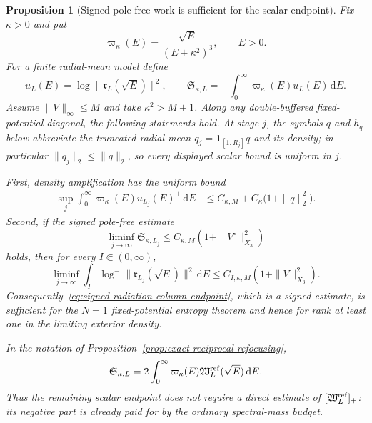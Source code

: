 \documentclass[11pt]{article}
\newcommand{\dd}{\,\mathrm d}
\newtheorem{proposition}[theorem]{Proposition}
\theoremstyle{definition}
\theoremstyle{remark}
\begin{document}
\begin{proposition}[Signed pole-free work is sufficient for the scalar endpoint]
\label{prop:signed-radiation-column-reduction}
Fix $\kappa>0$ and put
\begin{equation}
 \varpi_\kappa(E)=\frac{\sqrt E}{(E+\kappa^2)^3},
 \qquad E>0.
 \label{eq:rational-second-trace-weight}
\end{equation}
For a finite radial-mean model define
\begin{equation}
 u_L(E)=\log\|\mathfrak r_L(\sqrt E)\|^2,
 \qquad
 \mathfrak S_{\kappa,L}
 =-\int_0^\infty\varpi_\kappa(E)u_L(E)\dd E.
 \label{eq:signed-radiation-column-functional}
\end{equation}
Assume $\|V\|_\infty\leq M$ and take $\kappa^2>M+1$.  Along any
double-buffered fixed-potential diagonal, the following statements hold.
At stage $j$, the symbols $q$ and $h_q$ below abbreviate the truncated radial
mean $q_j=\mathbf1_{[1,R_j]}q$ and its density; in particular
$\|q_j\|_2\leq\|q\|_2$, so every displayed scalar bound is uniform in $j$.

First, density amplification has the uniform bound
\begin{align}
 \sup_j\int_0^\infty\varpi_\kappa(E)
       u_{L_j}(E)^+\dd E
 &\leq C_{\kappa,M}
   +C_\kappa\bigl(1+\|q\|_2^2\bigr).
 \label{eq:automatic-radiation-amplification}
\end{align}
Second, if the signed pole-free estimate
\begin{equation}
 \liminf_{j\to\infty}\mathfrak S_{\kappa,L_j}
 \leq C_{\kappa,M}
       \left(1+\|V^\circ\|_{X_3}^2\right)
 \label{eq:signed-radiation-column-endpoint}
\end{equation}
holds, then for every $I\Subset(0,\infty)$,
\begin{equation}
 \liminf_{j\to\infty}\int_I
  \log^-\|\mathfrak r_{L_j}(\sqrt E)\|^2\dd E
 \leq C_{I,\kappa,M}
       \left(1+\|V\|_{X_3}^2\right).
 \label{eq:signed-radiation-column-implies-entropy}
\end{equation}
Consequently~\eqref{eq:signed-radiation-column-endpoint}, which is a
\emph{signed} estimate, is sufficient for the $N=1$ fixed-potential entropy
theorem and hence for rank at least one in the limiting exterior density.

In the notation of Proposition~\ref{prop:exact-reciprocal-refocusing},
\begin{equation}
 \mathfrak S_{\kappa,L}
 =2\int_0^\infty\varpi_\kappa(E)
       \mathfrak W_L^{\rm ref}(\sqrt E)\dd E.
 \label{eq:signed-work-functional}
\end{equation}
Thus the remaining scalar endpoint does not require a direct estimate of
$[\mathfrak W_L^{\rm ref}]_+$: its negative part is already paid for by the
ordinary spectral-mass budget.
\end{proposition}
\end{document}
